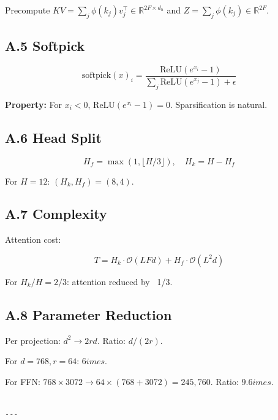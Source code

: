 Precompute $KV = \sum_j \phi(k_j) v_j^\top \in \mathbb{R}^{2F \times d_h}$ 
and $Z = \sum_j \phi(k_j) \in \mathbb{R}^{2F}$.

\subsection{A.5 Softpick}

\[
\text{softpick}(x)_i = \frac{\text{ReLU}(e^{x_i} - 1)}{\sum_j \text{ReLU}(e^{x_j} - 1) + \epsilon}
\]

\textbf{Property:} For $x_i < 0$, $\text{ReLU}(e^{x_i} - 1) = 0$. Sparsification 
is natural.

\subsection{A.6 Head Split}

\[
H_f = \max(1, \lfloor H/3 \rfloor), \quad H_k = H - H_f
\]

For $H = 12$: $(H_k, H_f) = (8, 4)$.

\subsection{A.7 Complexity}

Attention cost:

\[
T = H_k \cdot \mathcal{O}(L F d) + H_f \cdot \mathcal{O}(L^2 d)
\]

For $H_k/H = 2/3$: attention reduced by ~1/3.

\subsection{A.8 Parameter Reduction}

Per projection: $d^2 \to 2rd$. Ratio: $d / (2r)$.

For $d = 768, r = 64$: $6	imes$.

For FFN: $768 \times 3072 \to 64 \times (768 + 3072) = 245,760$. 
Ratio: $9.6	imes$.
\begin{lstlisting}

---
\end{lstlisting}
